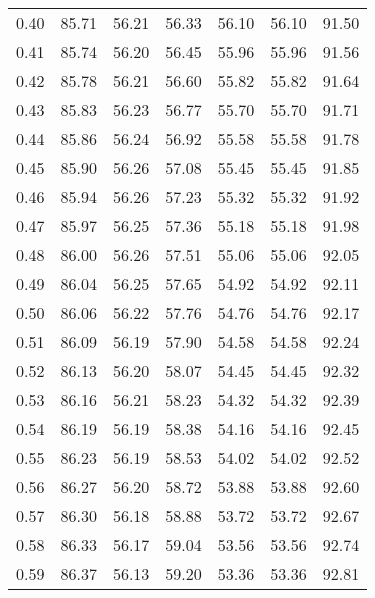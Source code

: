 \begin{tabular}{|c|c|c|c|c|c|c|}
      0.40 &     85.71 &     56.21 &      56.33 &   56.10 &      56.10 &         91.50 \\
      0.41 &     85.74 &     56.20 &      56.45 &   55.96 &      55.96 &         91.56 \\
      0.42 &     85.78 &     56.21 &      56.60 &   55.82 &      55.82 &         91.64 \\
      0.43 &     85.83 &     56.23 &      56.77 &   55.70 &      55.70 &         91.71 \\
      0.44 &     85.86 &     56.24 &      56.92 &   55.58 &      55.58 &         91.78 \\
      0.45 &     85.90 &     56.26 &      57.08 &   55.45 &      55.45 &         91.85 \\
      0.46 &     85.94 &     56.26 &      57.23 &   55.32 &      55.32 &         91.92 \\
      0.47 &     85.97 &     56.25 &      57.36 &   55.18 &      55.18 &         91.98 \\
      0.48 &     86.00 &     56.26 &      57.51 &   55.06 &      55.06 &         92.05 \\
      0.49 &     86.04 &     56.25 &      57.65 &   54.92 &      54.92 &         92.11 \\
      0.50 &     86.06 &     56.22 &      57.76 &   54.76 &      54.76 &         92.17 \\
      0.51 &     86.09 &     56.19 &      57.90 &   54.58 &      54.58 &         92.24 \\
      0.52 &     86.13 &     56.20 &      58.07 &   54.45 &      54.45 &         92.32 \\
      0.53 &     86.16 &     56.21 &      58.23 &   54.32 &      54.32 &         92.39 \\
      0.54 &     86.19 &     56.19 &      58.38 &   54.16 &      54.16 &         92.45 \\
      0.55 &     86.23 &     56.19 &      58.53 &   54.02 &      54.02 &         92.52 \\
      0.56 &     86.27 &     56.20 &      58.72 &   53.88 &      53.88 &         92.60 \\
      0.57 &     86.30 &     56.18 &      58.88 &   53.72 &      53.72 &         92.67 \\
      0.58 &     86.33 &     56.17 &      59.04 &   53.56 &      53.56 &         92.74 \\
      0.59 &     86.37 &     56.13 &      59.20 &   53.36 &      53.36 &         92.81 \\

\end{tabular}

